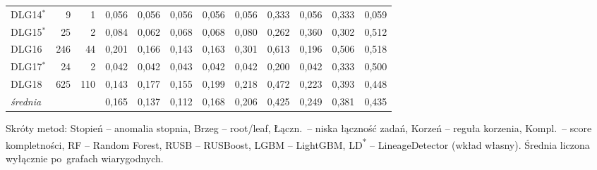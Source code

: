 \begin{table}[ht]
\begin{tabular}{lrrccccccccc}
DLG14$^{*}$ & 9 & 1 & 0{,}056 & 0{,}056 & 0{,}056 & 0{,}056 & 0{,}056 & 0{,}333 & 0{,}056 & 0{,}333 & 0{,}059 \\
DLG15$^{*}$ & 25 & 2 & 0{,}084 & 0{,}062 & 0{,}068 & 0{,}068 & 0{,}080 & 0{,}262 & 0{,}360 & 0{,}302 & 0{,}512 \\
DLG16 & 246 & 44 & 0{,}201 & 0{,}166 & 0{,}143 & 0{,}163 & 0{,}301 & 0{,}613 & 0{,}196 & 0{,}506 & 0{,}518 \\
DLG17$^{*}$ & 24 & 2 & 0{,}042 & 0{,}042 & 0{,}043 & 0{,}042 & 0{,}042 & 0{,}200 & 0{,}042 & 0{,}333 & 0{,}500 \\
DLG18 & 625 & 110 & 0{,}143 & 0{,}177 & 0{,}155 & 0{,}199 & 0{,}218 & 0{,}472 & 0{,}223 & 0{,}393 & 0{,}448 \\
\midrule
\emph{średnia} & & & 0{,}165 & 0{,}137 & 0{,}112 & 0{,}168 & 0{,}206 & 0{,}425 & 0{,}249 & 0{,}381 & 0{,}435 \\
\bottomrule
\end{tabular}

\vspace{0.4em}
\footnotesize Skróty metod: Stopień – anomalia stopnia, Brzeg – root/leaf, Łączn.\ – niska łączność zadań, Korzeń – reguła korzenia, Kompl.\ – score kompletności, RF – Random Forest, RUSB – RUSBoost, LGBM – LightGBM, LD\textsuperscript{*} – LineageDetector (wkład własny). Średnia liczona wyłącznie po~grafach wiarygodnych.
\end{table}

\clearpage

